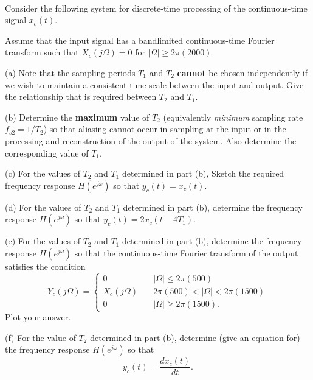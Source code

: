 \documentclass[12pt]{report}
\begin{document}
\newpage 
{}\\

Consider the following system for discrete-time processing of
the continuous-time signal $x_c(t)$.\\

\begin{figure}[h!]
	\centering
	\resizebox{\textwidth}{!}{}
\end{figure}


Assume that the input signal has a bandlimited continuous-time Fourier
transform such that $X_c(j\Omega)=0$ for $|\Omega|\geq 2\pi(2000)$.

\begin{description}
	\item{(a)} Note that the sampling periods $T_1$ and $T_2$ {\bf cannot} be
	chosen independently if we wish to maintain a consistent time scale
	between the input and output. Give the relationship that is required
	between $T_2$ and $T_1$.
	\item{(b)} Determine the {\bf maximum} value of $T_2$ (equivalently {\em
		minimum} sampling rate $f_{s2}=1/T_2$) so that  aliasing cannot occur  in sampling at the input or in the processing and reconstruction of the output of the system.  Also determine the corresponding value of $T_1$.
	\item{(c)} For the values of $T_2$ and $T_1$  determined in part (b), Sketch the required frequency response $H(e^{j\omega})$ so that $y_c(t)=x_c(t)$.
	\item{(d)} For the values of $T_2$ and $T_1$ determined in part (b), determine the
	frequency response $H(e^{j\omega})$ so that $y_c(t)=2x_c(t -4 T_1)$.
	\item{(e)} For the values of $T_2$ and $T_1$ determined in part (b), determine the
	frequency response $H(e^{j\omega})$ so that the continuous-time Fourier
	transform of the output satisfies the condition
	\[
	Y_c(j\Omega)=\left\{ \begin{array}{ll}
	0&\quad |\Omega|\leq 2\pi(500) \\
	X_c(j\Omega) &\quad 2\pi(500)<|\Omega|<2\pi(1500) \\
	0 &\quad |\Omega|\geq 2\pi(1500).
	\end{array}\right.
	\]
	Plot your answer.
	\item{(f)} For the value of $T_2$ determined in part (b), determine (give an equation for) the
	frequency response $H(e^{j\omega})$ so that
	\[
	y_c(t) = \frac{d x_c(t)}{dt}.
	\]
	
\end{description}
\end{document}
